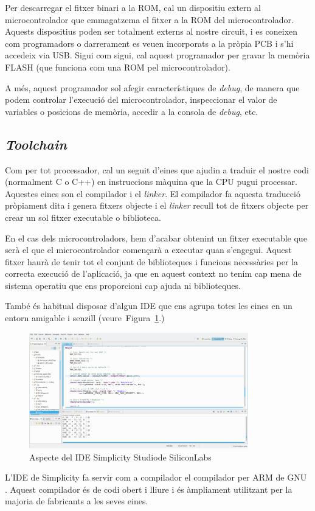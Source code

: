 Per descarregar el fitxer binari a la ROM, cal un dispositiu extern al microcontrolador que emmagatzema el fitxer a la ROM del microcontrolador. Aquests dispositius poden ser totalment externs al nostre circuit, i es coneixen com programadors o darrerament es veuen incorporats a la pròpia \gls{PCB} i s'hi accedeix via USB. Sigui com sigui, cal aquest programador per gravar la memòria FLASH (que funciona com una ROM pel microcontrolador).

A més, aquest programador sol afegir característiques de {\em debug}, de manera que podem controlar l'execució del microcontrolador, inspeccionar el valor de variables o posicions de memòria, accedir a la consola de {\em debug}, etc.

\subsection{{\em Toolchain}}
Com per tot processador, cal un seguit d'eines que ajudin a traduir el nostre codi (normalment C o C++) en instruccions màquina que la CPU pugui processar. Aquestes eines son el compilador i el {\em linker}. El compilador fa aquesta traducció pròpiament dita i genera fitxers objecte i el {\em linker} recull tot de fitxers objecte per crear un sol fitxer executable o biblioteca.

En el cas dels microcontroladors, hem d'acabar obtenint un fitxer executable que serà el que el microcontrolador començarà a executar quan s'engegui. Aquest fitxer haurà de tenir tot el conjunt de biblioteques i funcions necessàries per la correcta execució de l'aplicació, ja que en aquest context no tenim cap mena de sistema operatiu que ens proporcioni cap ajuda ni biblioteques.

També és habitual disposar d'algun \gls{IDE} que ens agrupa totes les eines en un entorn amigable i senzill (veure~Figura~\ref{fig:IDE}.)

\begin{figure}
 \centering
 \includegraphics[width=0.85\textwidth, keepaspectratio]{imatges/capturaIDE.png}
 \caption{Aspecte del IDE Simplicity Studio\texttrademark de SiliconLabs}
 \label{fig:IDE}
\end{figure}

L'\gls{IDE} de Simplicity fa servir com a compilador el compilador per ARM de GNU \cite{ARMGNU}. Aquest compilador és de codi obert i lliure i és àmpliament utilitzant per la majoria de fabricants a les seves eines.

